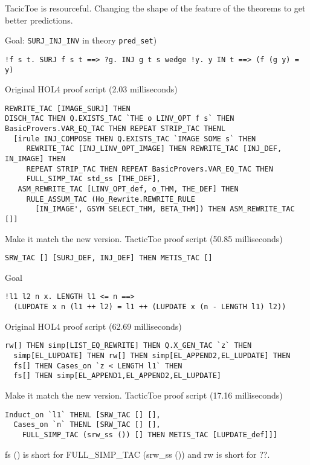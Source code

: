\documentclass[runningheads,a4paper,draft]{svjour3}
\def\holfour{\textsf{HOL4}\xspace}
\def\tactictoe{\textsf{TacticToe}\xspace}
\begin{document}
TacicToe is resourceful. Changing the shape of the feature of the theorems
to get better predictions.

Goal: \texttt{SURJ\_INJ\_INV} in theory \texttt{pred\_set})
\begin{lstlisting}[language=SMLSmall,frame=tb]
!f s t. SURJ f s t ==> ?g. INJ g t s wedge !y. y IN t ==> (f (g y) = y)
\end{lstlisting}

Original \holfour proof script (2.03 milliseconds)
\begin{lstlisting}[language=SMLSmall,frame=tb]
REWRITE_TAC [IMAGE_SURJ] THEN
DISCH_TAC THEN Q.EXISTS_TAC `THE o LINV_OPT f s` THEN
BasicProvers.VAR_EQ_TAC THEN REPEAT STRIP_TAC THENL 
  [irule INJ_COMPOSE THEN Q.EXISTS_TAC `IMAGE SOME s` THEN
     REWRITE_TAC [INJ_LINV_OPT_IMAGE] THEN REWRITE_TAC [INJ_DEF, IN_IMAGE] THEN
     REPEAT STRIP_TAC THEN REPEAT BasicProvers.VAR_EQ_TAC THEN
     FULL_SIMP_TAC std_ss [THE_DEF],
   ASM_REWRITE_TAC [LINV_OPT_def, o_THM, THE_DEF] THEN
     RULE_ASSUM_TAC (Ho_Rewrite.REWRITE_RULE
       [IN_IMAGE', GSYM SELECT_THM, BETA_THM]) THEN ASM_REWRITE_TAC []]
\end{lstlisting}

\vspace{5mm}

Make it match the new version.
\tactictoe proof script (50.85 milliseconds)
\begin{lstlisting}[language=SMLSmall,frame=tb]
SRW_TAC [] [SURJ_DEF, INJ_DEF] THEN METIS_TAC []
\end{lstlisting}


Goal
\begin{lstlisting}[language=SMLSmall,frame=tb]
!l1 l2 n x. LENGTH l1 <= n ==> 
  (LUPDATE x n (l1 ++ l2) = l1 ++ (LUPDATE x (n - LENGTH l1) l2))
\end{lstlisting}

\vspace{5mm}

Original \holfour proof script (62.69 milliseconds)
\begin{lstlisting}[language=SMLSmall,frame=tb]
  rw[] THEN simp[LIST_EQ_REWRITE] THEN Q.X_GEN_TAC `z` THEN
  simp[EL_LUPDATE] THEN rw[] THEN simp[EL_APPEND2,EL_LUPDATE] THEN
  fs[] THEN Cases_on `z < LENGTH l1` THEN
  fs[] THEN simp[EL_APPEND1,EL_APPEND2,EL_LUPDATE]
\end{lstlisting}


\vspace{5mm}
Make it match the new version.
\tactictoe proof script (17.16 milliseconds)
\begin{lstlisting}[language=SMLSmall,frame=tb]
Induct_on `l1` THENL [SRW_TAC [] [],
  Cases_on `n` THENL [SRW_TAC [] [],
    FULL_SIMP_TAC (srw_ss ()) [] THEN METIS_TAC [LUPDATE_def]]]
\end{lstlisting}
fs () is short for FULL\_SIMP\_TAC (srw\_ss ()) and rw is short for ??.
\end{document}
